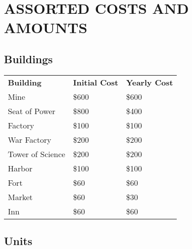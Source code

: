 
\chapter[Assorted Costs and Amounts]{\textsf{ASSORTED COSTS AND AMOUNTS}}


\section{\textsf{Buildings}}

\begin{tabular}{|p{1.3in} p{1.3in} p{1.3in}|}
    \hline
    \textbf{Building} & \textbf{Initial Cost} & \textbf{Yearly Cost} \\ 
    \rowcolor{gray}Mine & \$600 & \$600 \\ 
    Seat of Power & \$800 & \$400 \\ 
    \rowcolor{gray}Factory    & \$100 & \$100 \\ 
    War Factory    & \$200 & \$200 \\ 
    \rowcolor{gray}Tower of Science & \$200 & \$200 \\ 
    Harbor & \$100 &\$100 \\ 
    \rowcolor{gray}Fort & \$60 & \$60 \\ 
    Market & \$60 & \$30 \\ 
    \rowcolor{gray}Inn    & \$60 & \$60 \\ 
    \hline
\end{tabular}    

\clearpage

\section{\textsf{Units}}


